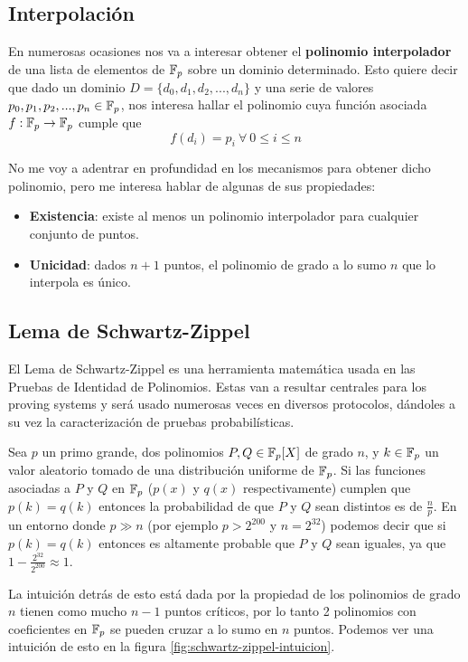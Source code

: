 \subsection{Interpolación}

En numerosas ocasiones nos va a interesar obtener el \textbf{polinomio interpolador} de una lista de elementos de $\mathbb{F}_p$ sobre un dominio determinado. Esto quiere decir que dado un dominio $D = \{d_0, d_1, d_2, ..., d_n\}$ y una serie de valores $p_0, p_1, p_2, ..., p_n \in \mathbb{F}_p$, nos interesa hallar el polinomio cuya función asociada $f: \mathbb{F}_p \rightarrow \mathbb{F}_p$ cumple que $$f(d_i) = p_i ~ \forall ~ 0 \leq i \leq n$$

No me voy a adentrar en profundidad en los mecanismos para obtener dicho polinomio, pero me interesa hablar de algunas de sus propiedades:
\begin{itemize}
    \item \textbf{Existencia}: existe al menos un polinomio interpolador para cualquier conjunto de puntos.
    \item \textbf{Unicidad}: dados $n+1$ puntos, el polinomio de grado a lo sumo $n$ que lo interpola es único.
\end{itemize}

\subsection{Lema de Schwartz-Zippel} \label{sec:zippel}
El Lema de Schwartz-Zippel es una herramienta matemática usada en las Pruebas de Identidad de Polinomios. Estas van a resultar centrales para los proving systems y será usado numerosas veces en diversos protocolos, dándoles a su vez la caracterización de pruebas probabilísticas.

Sea $p$ un primo grande, dos polinomios $P, Q \in \mathbb{F}_p[X]$ de grado $n$, y $k \in \mathbb{F}_p$ un valor aleatorio tomado de una distribución uniforme de $\mathbb{F}_p$. Si las funciones asociadas a $P$ y $Q$ en $\mathbb{F}_p$ ($p(x)$ y $q(x)$ respectivamente) cumplen que $p(k) = q(k)$ entonces la probabilidad de que $P$ y $Q$ sean distintos es de $\frac{n}{p}$. En un entorno donde $p \gg n$ (por ejemplo $p>2^{200}$ y $n=2^{32}$) podemos decir que si $p(k) = q(k)$ entonces es altamente probable que $P$ y $Q$ sean iguales, ya que $1 - \frac{2^{32}}{2^{200}} \approx 1$. 

La intuición detrás de esto está dada por la propiedad de los polinomios de grado $n$ tienen como mucho $n-1$ puntos críticos, por lo tanto 2 polinomios con coeficientes en $\mathbb{F}_p$ se pueden cruzar a lo sumo en $n$ puntos. Podemos ver una intuición de esto en la figura \ref{fig:schwartz-zippel-intuicion}.


